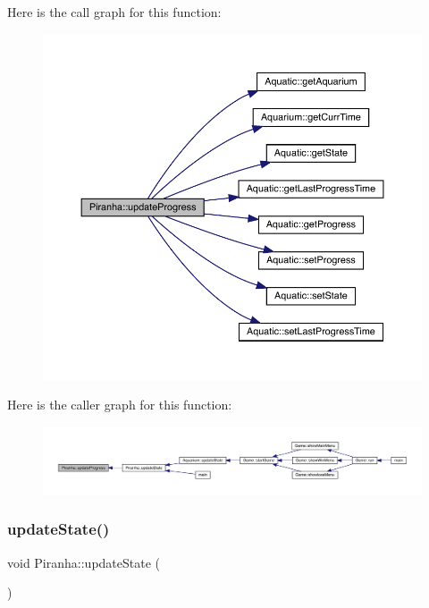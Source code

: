 Here is the call graph for this function\+:\nopagebreak
\begin{figure}[H]
\begin{center}
\leavevmode
\includegraphics[width=350pt]{class_piranha_ac4906080867655ef09591eba1cf2f00c_cgraph}
\end{center}
\end{figure}
Here is the caller graph for this function\+:
\nopagebreak
\begin{figure}[H]
\begin{center}
\leavevmode
\includegraphics[width=350pt]{class_piranha_ac4906080867655ef09591eba1cf2f00c_icgraph}
\end{center}
\end{figure}
\mbox{\label{class_piranha_a851c302af9de1d6eaf727242e2912f62}} 
\subsubsection{\texorpdfstring{update\+State()}{updateState()}}
{\footnotesize\ttfamily void Piranha\+::update\+State (\begin{DoxyParamCaption}{ }\end{DoxyParamCaption})\hspace{0.3cm}{\ttfamily [virtual]}}



